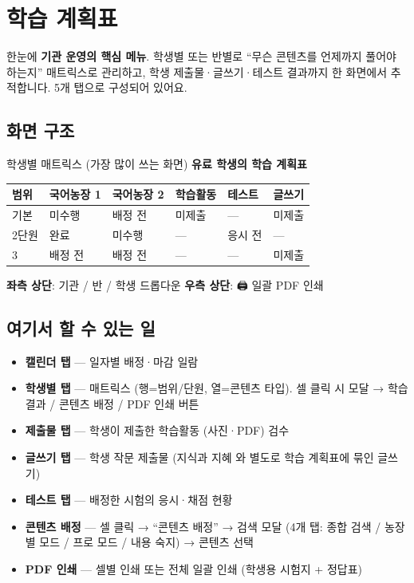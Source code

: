 \chapter{학습 계획표}

\begin{summarybox}{한눈에}
\textbf{기관 운영의 핵심 메뉴}. 학생별 또는 반별로 ``무슨 콘텐츠를 언제까지 풀어야 하는지'' 매트릭스로 관리하고, 학생 제출물·글쓰기·테스트 결과까지 한 화면에서 추적합니다. 5개 탭으로 구성되어 있어요.
\end{summarybox}


\section*{화면 구조}


\begin{screenbox}{학생별 매트릭스 (가장 많이 쓰는 화면)}
\textbf{유료 학생의 학습 계획표}

\medskip
\noindent
\begin{tabular}{@{}p{1.5cm}p{2cm}p{2cm}p{2cm}p{2cm}p{2cm}@{}}
\toprule
\textbf{범위} & \textbf{국어농장 1} & \textbf{국어농장 2} & \textbf{학습활동} & \textbf{테스트} & \textbf{글쓰기} \\
\midrule
기본 & 미수행 & 배정 전 & 미제출 & — & 미제출 \\
2단원 & 완료 & 미수행 & — & 응시 전 & — \\
3 & 배정 전 & 배정 전 & — & — & 미제출 \\
\bottomrule
\end{tabular}

\medskip
\textbf{좌측 상단}: 기관 / 반 / 학생 드롭다운 \quad
\textbf{우측 상단}: 🖨 일괄 PDF 인쇄
\end{screenbox}

\section*{여기서 할 수 있는 일}
\begin{itemize}[leftmargin=1.2em]
  \item \textbf{캘린더 탭} — 일자별 배정·마감 일람
  \item \textbf{학생별 탭} — 매트릭스 (행=범위/단원, 열=콘텐츠 타입). 셀 클릭 시 모달 → 학습 결과 / 콘텐츠 배정 / PDF 인쇄 버튼
  \item \textbf{제출물 탭} — 학생이 제출한 학습활동 (사진·PDF) 검수
  \item \textbf{글쓰기 탭} — 학생 작문 제출물 (지식과 지혜 와 별도로 학습 계획표에 묶인 글쓰기)
  \item \textbf{테스트 탭} — 배정한 시험의 응시·채점 현황
  \item \textbf{콘텐츠 배정} — 셀 클릭 → ``콘텐츠 배정'' → 검색 모달 (4개 탭: 종합 검색 / 농장별 모드 / 프로 모드 / 내용 숙지) → 콘텐츠 선택
  \item \textbf{PDF 인쇄} — 셀별 인쇄 또는 전체 일괄 인쇄 (학생용 시험지 + 정답표)
\end{itemize}

